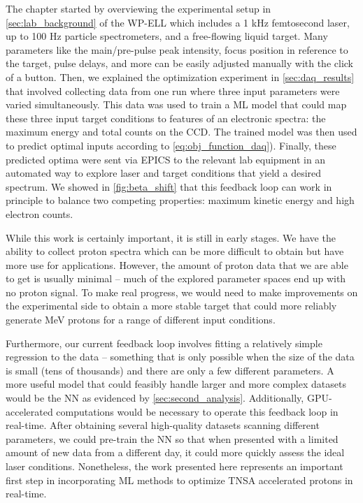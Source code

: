 The chapter started by overviewing the experimental setup in \autoref{sec:lab_background} of the \gls{WP-ELL} which includes a 1 kHz femtosecond laser, up to 100 Hz particle spectrometers, and a free-flowing liquid target. Many parameters like the main/pre-pulse peak intensity, focus position in reference to the target, pulse delays, and more can be easily adjusted manually with the click of a button. Then, we explained the optimization experiment in \autoref{sec:daq_results} that involved collecting data from one run where three input parameters were varied simultaneously. This data was used to train a \gls{ML} model that could map these three input target conditions to features of an electronic spectra: the maximum energy and total counts on the \gls{CCD}. The trained model was then used to predict optimal inputs according to \autoref{eq:obj_function_daq}). Finally, these predicted optima were sent via \gls{EPICS} to the relevant lab equipment in an automated way to explore laser and target conditions that yield a desired spectrum. We showed in \autoref{fig:beta_shift} that this feedback loop can work in principle to balance two competing properties: maximum kinetic energy and high electron counts. 

While this work is certainly important, it is still in early stages. We have the ability to collect proton spectra which can be more difficult to obtain but have more use for applications. However, the amount of proton data that we are able to get is usually minimal -- much of the explored parameter spaces end up with no proton signal. To make real progress, we would need to make improvements on the experimental side to obtain a more stable target that could more reliably generate MeV protons for a range of different input conditions.

Furthermore, our current feedback loop involves fitting a relatively simple regression to the data -- something that is only possible when the size of the data is small (tens of thousands) and there are only a few different parameters. A more useful model that could feasibly handle larger and more complex datasets would be the \gls{NN} as evidenced by \autoref{sec:second_analysis}. Additionally, \gls{GPU}-accelerated computations would be necessary to operate this feedback loop in real-time. After obtaining several high-quality datasets scanning different parameters, we could pre-train the \gls{NN} so that when presented with a limited amount of new data from a different day, it could more quickly assess the ideal laser conditions. Nonetheless, the work presented here represents an important first step in incorporating \gls{ML} methods to optimize \gls{TNSA} accelerated protons in real-time. 